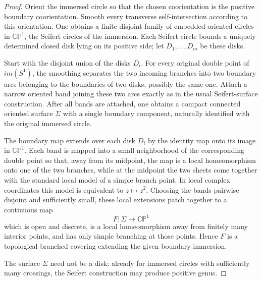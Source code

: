 \documentclass[reqno]{amsart}
\theoremstyle{definition}
\newcommand {\bCP} {\mathbb {CP}}
\newcommand{\Si}{\Sigma}
\begin{document}
\begin{proof}
Orient the immersed circle so that the chosen coorientation is the positive boundary coorientation. Smooth every transverse self-intersection according to this orientation. One obtains a finite disjoint family of embedded oriented circles in $\bCP^1$, the Seifert circles of the immersion. Each Seifert circle bounds a uniquely determined closed disk lying on its positive side; let $D_1,\dots,D_m$ be these disks.

Start with the disjoint union of the disks $D_i$. For every original double point of $im(S^1)$, the smoothing separates the two incoming branches into two boundary arcs belonging to the boundaries of two disks, possibly the same one. Attach a narrow oriented band joining these two arcs exactly as in the usual Seifert-surface construction. After all bands are attached, one obtains a compact connected oriented surface $\Si$ with a single boundary component, naturally identified with the original immersed circle.

The boundary map extends over each disk $D_i$ by the identity map onto its image in $\bCP^1$. Each band is mapped into a small neighborhood of the corresponding double point so that, away from its midpoint, the map is a local homeomorphism onto one of the two branches, while at the midpoint the two sheets come together with the standard local model of a simple branch point. In local complex coordinates this model is equivalent to $z\mapsto z^2$. Choosing the bands pairwise disjoint and sufficiently small, these local extensions patch together to a continuous map
\[
F:\Si\to \bCP^1
\]
which is open and discrete, is a local homeomorphism away from finitely many interior points, and has only simple branching at those points. Hence $F$ is a topological branched covering extending the given boundary immersion.

The surface $\Si$ need not be a disk: already for immersed circles with sufficiently many crossings, the Seifert construction may produce positive genus.
\end{proof}
\end{document}
